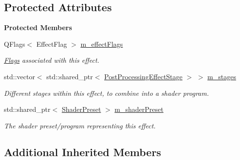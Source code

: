 \subsection*{Protected Attributes}
\begin{Indent}\textbf{ Protected Members}\par
\begin{DoxyCompactItemize}
\item 
\mbox{\label{classrev_1_1_post_processing_effect_ac4c2a0304105696aab9938d1839ef70c}} 
Q\+Flags$<$ Effect\+Flag $>$ \mbox{\hyperlink{classrev_1_1_post_processing_effect_ac4c2a0304105696aab9938d1839ef70c}{m\+\_\+effect\+Flags}}
\begin{DoxyCompactList}\small\item\em \mbox{\hyperlink{classrev_1_1_flags}{Flags}} associated with this effect. \end{DoxyCompactList}\item 
\mbox{\label{classrev_1_1_post_processing_effect_a52372e9b16b4fbcf560a4d7ddaeb4d78}} 
std\+::vector$<$ std\+::shared\+\_\+ptr$<$ \mbox{\hyperlink{classrev_1_1_post_processing_effect_stage}{Post\+Processing\+Effect\+Stage}} $>$ $>$ \mbox{\hyperlink{classrev_1_1_post_processing_effect_a52372e9b16b4fbcf560a4d7ddaeb4d78}{m\+\_\+stages}}
\begin{DoxyCompactList}\small\item\em Different stages within this effect, to combine into a shader program. \end{DoxyCompactList}\item 
\mbox{\label{classrev_1_1_post_processing_effect_a7ffe4c041853abef2165c5262734ced6}} 
std\+::shared\+\_\+ptr$<$ \mbox{\hyperlink{classrev_1_1_shader_preset}{Shader\+Preset}} $>$ \mbox{\hyperlink{classrev_1_1_post_processing_effect_a7ffe4c041853abef2165c5262734ced6}{m\+\_\+shader\+Preset}}
\begin{DoxyCompactList}\small\item\em The shader preset/program representing this effect. \end{DoxyCompactList}\end{DoxyCompactItemize}
\end{Indent}
\subsection*{Additional Inherited Members}


